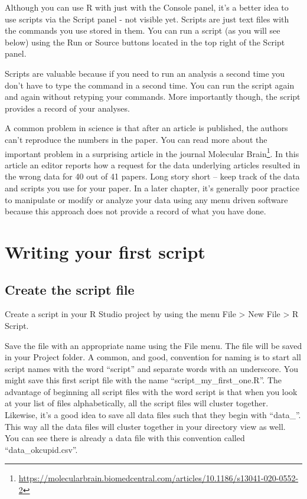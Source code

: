 \documentclass[
]{krantz}
\renewcommand{\href}[2]{#2\footnote{\url{#1}}}
\begin{document}
Although you can use R with just with the Console panel, it's a better idea to use scripts via the Script panel - not visible yet. Scripts are just text files with the commands you use stored in them. You can run a script (as you will see below) using the Run or Source buttons located in the top right of the Script panel.

Scripts are valuable because if you need to run an analysis a second time you don't have to type the command in a second time. You can run the script again and again without retyping your commands. More importantly though, the script provides a record of your analyses.

A common problem in science is that after an article is published, the authors can't reproduce the numbers in the paper. You can read more about the important problem in a surprising article in the journal \href{https://molecularbrain.biomedcentral.com/articles/10.1186/s13041-020-0552-2}{Molecular Brain}. In this article an editor reports how a request for the data underlying articles resulted in the wrong data for 40 out of 41 papers. Long story short -- keep track of the data and scripts you use for your paper. In a later chapter, it's generally poor practice to manipulate or modify or analyze your data using any menu driven software because this approach does not provide a record of what you have done.

\hypertarget{writing-your-first-script}{%
\section{Writing your first script}\label{writing-your-first-script}}

\hypertarget{create-the-script-file}{%
\subsection{Create the script file}\label{create-the-script-file}}

Create a script in your R Studio project by using the menu File \textgreater{} New File \textgreater{} R Script.

Save the file with an appropriate name using the File menu. The file will be saved in your Project folder. A common, and good, convention for naming is to start all script names with the word ``script'' and separate words with an underscore. You might save this first script file with the name ``script\_my\_first\_one.R''. The advantage of beginning all script files with the word script is that when you look at your list of files alphabetically, all the script files will cluster together. Likewise, it's a good idea to save all data files such that they begin with ``data\_''. This way all the data files will cluster together in your directory view as well. You can see there is already a data file with this convention called ``data\_okcupid.csv''.
\end{document}
